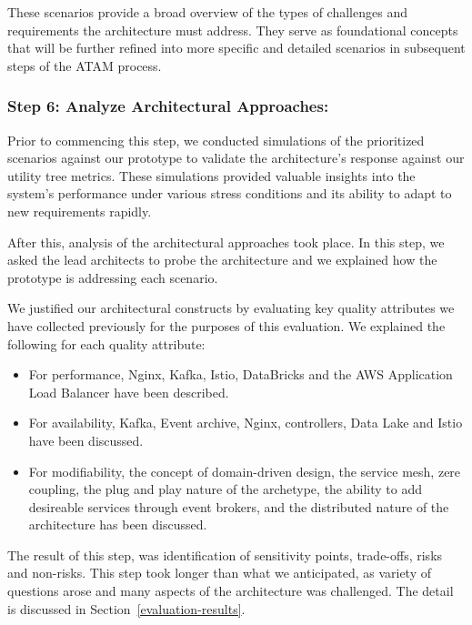 \documentclass[review]{elsarticle}
\begin{document}
 These scenarios provide a broad overview of the types of challenges and requirements the architecture must address. They serve as foundational concepts that will be further refined into more specific and detailed scenarios in subsequent steps of the ATAM process.


\subsubsection{Step 6: Analyze Architectural Approaches:}

Prior to commencing this step, we conducted simulations of the prioritized scenarios against our prototype to validate the architecture's response against our utility tree metrics. These simulations provided valuable insights into the system's performance under various stress conditions and its ability to adapt to new requirements rapidly. 

After this, analysis of the architectural approaches took place. In this step, we asked the lead architects to probe the architecture and we explained how the prototype is addressing each scenario. 

We justified our architectural constructs by evaluating key quality attributes we have collected previously for the purposes of this evaluation. We explained the following for each quality attribute:

\begin{itemize}
    \item For performance, Nginx, Kafka, Istio, DataBricks and the AWS Application Load Balancer have been described.
    \item For availability, Kafka, Event archive, Nginx, controllers, Data Lake and Istio have been discussed.
    \item For modifiability, the concept of domain-driven design, the service mesh, zere coupling, the plug and play nature of the archetype, the ability to add desireable services through event brokers, and the distributed nature of the architecture has been discussed.
\end{itemize}

The result of this step, was identification of sensitivity points, trade-offs, risks and non-risks. This step took longer than what we anticipated, as variety of questions arose and many aspects of the architecture was challenged. The detail is discussed in Section~\ref{evaluation-results}. 
 
\end{document}
